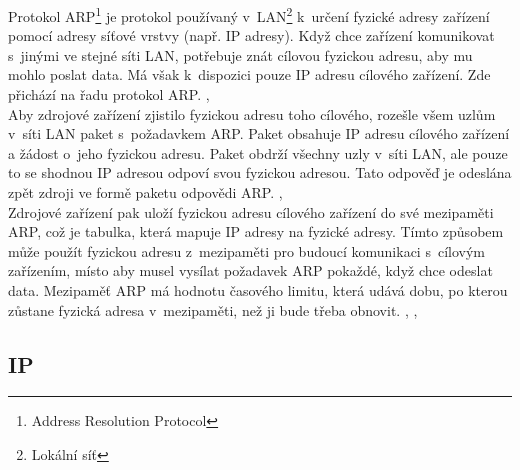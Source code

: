 \documentclass[12pt]{report}			%
\begin{document}
				
Protokol ARP\footnote{Address Resolution Protocol} je protokol používaný v~LAN\footnote{Lokální síť} k~určení fyzické adresy zařízení pomocí adresy síťové vrstvy (např. IP adresy). Když chce zařízení komunikovat s~jinými ve stejné síti LAN, potřebuje znát cílovou fyzickou adresu, aby mu mohlo poslat data. Má však k~dispozici pouze IP adresu cílového zařízení. Zde přichází na řadu protokol ARP. \cite{arp3}, \cite{arp1}
\\
Aby zdrojové zařízení zjistilo fyzickou adresu toho cílového, rozešle všem uzlům v~síti LAN paket s~požadavkem ARP. Paket obsahuje IP adresu cílového zařízení a žádost o~jeho fyzickou adresu. Paket obdrží všechny uzly v~síti LAN, ale pouze to se shodnou IP adresou odpoví svou fyzickou adresou. Tato odpověď je odeslána zpět zdroji ve formě paketu odpovědi ARP. \cite{arp3}, \cite{arp2}
\\
Zdrojové zařízení pak uloží fyzickou adresu cílového zařízení do své mezipaměti ARP, což je tabulka, která mapuje IP adresy na fyzické adresy. Tímto způsobem může použít fyzickou adresu z~mezipaměti pro budoucí komunikaci s~cílovým zařízením, místo aby musel vysílat požadavek ARP pokaždé, když chce odeslat data. Mezipaměť ARP má hodnotu časového limitu, která udává dobu, po kterou zůstane fyzická adresa v~mezipaměti, než ji bude třeba obnovit. \cite{arp1}, \cite{arp2}, \cite{arp3}

				\subsection{IP}
				
\end{document}
